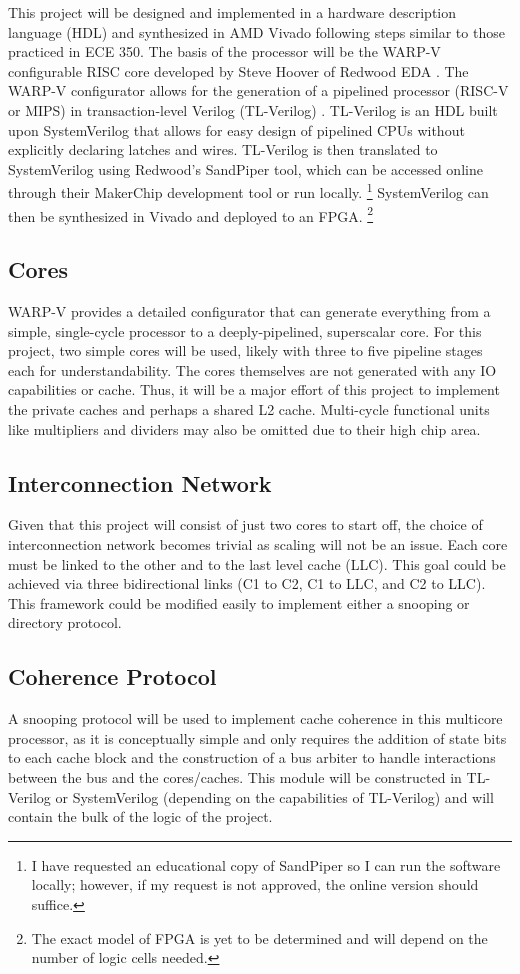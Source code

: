 \documentclass[10pt]{article}
\begin{document}
This project will be designed and implemented in a hardware description language (HDL) and synthesized in AMD Vivado following steps similar to those practiced in ECE 350. The basis of the processor will be the WARP-V configurable RISC core developed by Steve Hoover of Redwood EDA \cite{warpv}. The WARP-V configurator allows for the generation of a pipelined processor (RISC-V or MIPS) in transaction-level Verilog (TL-Verilog) \cite{tlx}. TL-Verilog is an HDL built upon SystemVerilog that allows for easy design of pipelined CPUs without explicitly declaring latches and wires. TL-Verilog is then translated to SystemVerilog using Redwood's SandPiper tool, which can be accessed online through their MakerChip development tool or run locally. \footnote{I have requested an educational copy of SandPiper so I can run the software locally; however, if my request is not approved, the online version should suffice.} SystemVerilog can then be synthesized in Vivado and deployed to an FPGA. \footnote{The exact model of FPGA is yet to be determined and will depend on the number of logic cells needed.}

\subsection{Cores}
WARP-V provides a detailed configurator that can generate everything from a simple, single-cycle processor to a deeply-pipelined, superscalar core. For this project, two simple cores will be used, likely with three to five pipeline stages each for understandability. The cores themselves are not generated with any IO capabilities or cache. Thus, it will be a major effort of this project to implement the private caches and perhaps a shared L2 cache. Multi-cycle functional units like multipliers and dividers may also be omitted due to their high chip area. 

\subsection{Interconnection Network} 
Given that this project will consist of just two cores to start off, the choice of interconnection network becomes trivial as scaling will not be an issue. Each core must be linked to the other and to the last level cache (LLC). This goal could be achieved via three bidirectional links (C1 to C2, C1 to LLC, and C2 to LLC). This framework could be modified easily to implement either a snooping or directory protocol. 

\subsection{Coherence Protocol}
A snooping protocol will be used to implement cache coherence in this multicore processor, as it is conceptually simple and only requires the addition of state bits to each cache block and the construction of a bus arbiter to handle interactions between the bus and the cores/caches. This module will be constructed in TL-Verilog or SystemVerilog (depending on the capabilities of TL-Verilog) and will contain the bulk of the logic of the project. 
\end{document}
